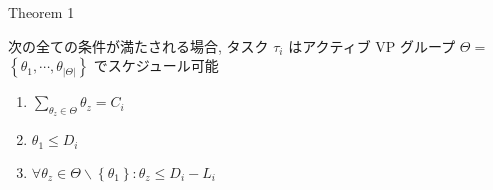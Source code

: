 \begin{frame}[label=theorem1]{Theorem 1}
    \begin{theorem}[]
        次の全ての条件が満たされる場合, タスク $\tau_{i}$ はアクティブ VP グループ $\Theta=$  $\left\{\theta_{1}, \cdots, \theta_{|\Theta|}\right\}$ でスケジュール可能
        \begin{enumerate}
            \item $\sum_{\theta_{z} \in \Theta} \theta_{z}=C_{i}$
            \item $\theta_{1} \leq D_{i}$
            \item $\forall \theta_{z} \in \Theta \backslash\left\{\theta_{1}\right\}: \theta_{z} \leq D_{i}-L_{i}$
        \end{enumerate}
    \end{theorem}
\end{frame}
